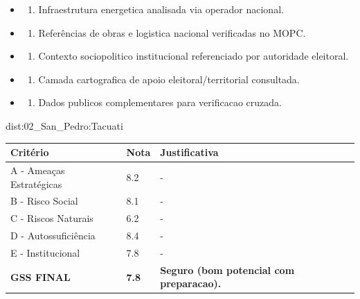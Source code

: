 {\begin{itemize}
\item
  \begin{enumerate}
  \def\labelenumi{\arabic{enumi})}
  \setcounter{enumi}{7}
  \tightlist
  \item
    Infraestrutura energetica analisada via operador nacional.
  \end{enumerate}
\item
  \begin{enumerate}
  \def\labelenumi{\arabic{enumi})}
  \setcounter{enumi}{8}
  \tightlist
  \item
    Referências de obras e logistica nacional verificadas no MOPC.
  \end{enumerate}
\item
  \begin{enumerate}
  \def\labelenumi{\arabic{enumi})}
  \setcounter{enumi}{9}
  \tightlist
  \item
    Contexto sociopolitico institucional referenciado por autoridade
    eleitoral.
  \end{enumerate}
\item
  \begin{enumerate}
  \def\labelenumi{\arabic{enumi})}
  \setcounter{enumi}{10}
  \tightlist
  \item
    Camada cartografica de apoio eleitoral/\allowbreak territorial consultada.
  \end{enumerate}
\item
  \begin{enumerate}
  \def\labelenumi{\arabic{enumi})}
  \setcounter{enumi}{11}
  \tightlist
  \item
    Dados publicos complementares para verificacao cruzada.
  \end{enumerate}
\end{itemize}}{dist:02_San_Pedro:Tacuati}
\begin{table}[ht!]
\small \begin{tabular}{p{3.0cm}p{0.8cm}p{6.0cm}} \toprule
\textbf{Critério} & \textbf{Nota} & \textbf{Justificativa} \\ \midrule
A - Ameaças Estratégicas & 8.2 & - \\
B - Risco Social & 8.1 & - \\
C - Riscos Naturais & 6.2 & - \\
D - Autossuficiência & 8.4 & - \\
E - Institucional & 7.8 & - \\
\midrule \textbf{GSS FINAL} & \textbf{7.8} & \textbf{Seguro (bom potencial com preparacao).} \\ \bottomrule \end{tabular}
\end{table}
